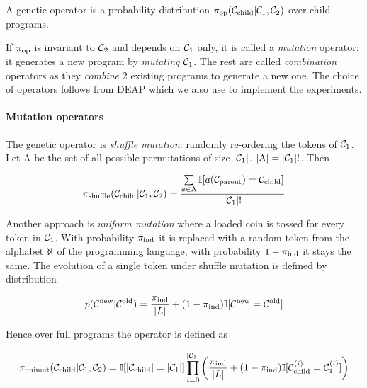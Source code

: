 A genetic operator is a probability distribution $\pi_\text{op}(\mathcal{C}_\text{child}|\mathcal{C}_1,\mathcal{C}_2)$ over child programs. 

If $\pi_\text{op}$ is invariant to $\mathcal{C}_2$ and depends on $\mathcal{C}_1$ only, it is called a \emph{mutation} operator: it generates a new program by \emph{mutating} $\mathcal{C}_1$.
The rest are called \emph{combination} operators as they \emph{combine} 2 existing programs to generate a new one.
The choice of operators follows from DEAP \cite{deap, derainvilleDEAPEnablingNimbler2014, derainvilleDEAPPythonFramework2012} which we also use to implement the experiments.

\paragraph{Mutation operators}

The genetic operator is \emph{shuffle mutation}: randomly re-ordering the tokens of $\mathcal{C}_1$.
Let $\mathrm{A}$ be the set of all possible permutations of size $|\mathcal{C}_1|$. $|\mathrm{A}|=|\mathcal{C}_1|!$. 
Then

\begin{equation}
    \pi_\text{shuffle}(\mathcal{C}_\text{child}|\mathcal{C}_1,\mathcal{C}_2) =
            \frac{\sum\limits_{a \in \mathrm{A}} \mathbb{I} [a(\mathcal{C}_\text{parent}) = \mathcal{C}_\text{child}]}{|\mathcal{C}_1|!}
\end{equation}

Another approach is \emph{uniform mutation} where a loaded coin is tossed for every token in $\mathcal{C}_1$. 
With probability $\pi_\text{ind}$ it is replaced with a random token from the alphabet $\aleph$ of the programming language, with probability $1-\pi_\text{ind}$ it stays the same.
The evolution of a single token under shuffle mutation is defined by distribution

\begin{equation}
    p(\mathcal{C}^\text{new} | \mathcal{C}^\text{old}) = \frac{\pi_\text{ind}}{|L|} +  (1 - \pi_\text{ind}) \mathbb{I} [\mathcal{C}^\text{new} = \mathcal{C}^\text{old}]
\end{equation}

Hence over full programs the operator is defined as

\begin{equation}
    \pi_\text{unimut}(\mathcal{C}_\text{child}|\mathcal{C}_1,\mathcal{C}_2) = \mathbb{I} [|\mathcal{C}_\text{child}|=|\mathcal{C}_1|] \\ 
    \prod\limits_{i=0}^{|\mathcal{C}_1|}  \left(\frac{\pi_\text{ind}}{|L|} +  (1 - \pi_\text{ind}) \mathbb{I} [\mathcal{C}_\text{child}^{(i)} = \mathcal{C}_1^{(i)}] \right)
\end{equation}


